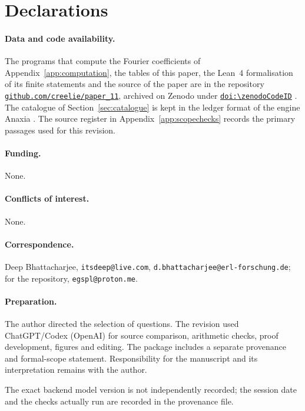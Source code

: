 \section*{Declarations}

\paragraph*{Data and code availability.} The programs that compute the Fourier coefficients of Appendix~\ref{app:computation}, the tables of this paper, the Lean~4 formalisation of its finite statements and the source of the paper are in the repository \href{https://github.com/creelie/paper_11}{\nolinkurl{github.com/creelie/paper_11}}, archived on Zenodo under \href{https://doi.org/\zenodoCodeID}{\nolinkurl{doi:\zenodoCodeID}} \cite{Bha26}. The catalogue of Section~\ref{sec:catalogue} is kept in the ledger format of the engine Anaxia \cite{BLLM26}. The source register in Appendix~\ref{app:scopechecks} records the primary passages used for this revision.

\paragraph*{Funding.} None.

\paragraph*{Conflicts of interest.} None.

\paragraph*{Correspondence.} Deep Bhattacharjee, \nolinkurl{itsdeep@live.com}, \nolinkurl{d.bhattacharjee@erl-forschung.de}; for the repository, \nolinkurl{egspl@proton.me}.

\paragraph*{Preparation.} The author directed the selection of questions. The revision used ChatGPT/Codex (OpenAI) for source comparison, arithmetic checks, proof development, figures and editing. The package includes a separate provenance and formal-scope statement. Responsibility for the manuscript and its interpretation remains with the author.

The exact backend model version is not independently recorded; the session date and the checks actually run are recorded in the provenance file.
